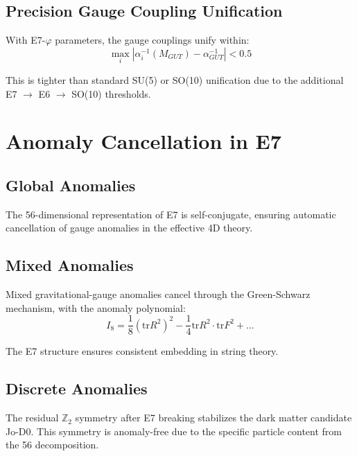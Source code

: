 \documentclass[11pt,a4paper]{article}
\begin{document}
\subsection{Precision Gauge Coupling Unification}

With E7-$\varphi$ parameters, the gauge couplings unify within:
\begin{equation}
\max_i \left|\alpha_i^{-1}(M_{GUT}) - \alpha_{GUT}^{-1}\right| < 0.5
\end{equation}

This is tighter than standard SU(5) or SO(10) unification due to the additional E7 $\to$ E6 $\to$ SO(10) thresholds.

\section{Anomaly Cancellation in E7}
\label{sec:anomaly}

\subsection{Global Anomalies}

The 56-dimensional representation of E7 is self-conjugate, ensuring automatic cancellation of gauge anomalies in the effective 4D theory.

\subsection{Mixed Anomalies}

Mixed gravitational-gauge anomalies cancel through the Green-Schwarz mechanism, with the anomaly polynomial:
\begin{equation}
I_8 = \frac{1}{8}(\text{tr} R^2)^2 - \frac{1}{4}\text{tr} R^2 \cdot \text{tr} F^2 + \ldots
\end{equation}

The E7 structure ensures consistent embedding in string theory.

\subsection{Discrete Anomalies}

The residual $\mathbb{Z}_2$ symmetry after E7 breaking stabilizes the dark matter candidate Jo-D0. This symmetry is anomaly-free due to the specific particle content from the 56 decomposition.
\end{document}
